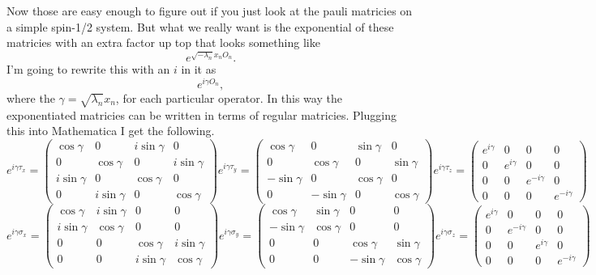 \documentclass[12pt]{extarticle}
\begin{document}
Now those are easy enough to figure out if you just look at the pauli matricies on a simple spin-1/2 system. But what we really want is the exponential of these matricies with an extra factor up top that looks something like
\begin{equation}
   e^{\sqrt{-\lambda_n}x_nO_n}.
\end{equation}
I'm going to rewrite this with an $i$ in it as
\begin{equation}
   e^{i\gamma O_n},
\end{equation}
where the $\gamma=\sqrt{\lambda_n}x_n$, for each particular operator. In this way the exponentiated matricies can be written in terms of regular matricies. Plugging this into Mathematica I get the following.
\footnotesize
\begin{equation*}
e^{i\gamma\tau_x}=
\begin{pmatrix}
    \cos\gamma & 0 & i\sin\gamma & 0 \\
    0 & \cos\gamma & 0 & i\sin\gamma \\
    i\sin\gamma & 0 & \cos\gamma & 0 \\
    0 & i\sin\gamma & 0 & \cos\gamma
\end{pmatrix}
e^{i\gamma\tau_y}=
\begin{pmatrix}
    \cos\gamma & 0 & \sin\gamma & 0 \\
    0 & \cos\gamma & 0 & \sin\gamma \\
    -\sin\gamma & 0 & \cos\gamma & 0 \\
    0 & -\sin\gamma & 0 & \cos\gamma
\end{pmatrix}
e^{i\gamma\tau_z}=
\begin{pmatrix}
    e^{i\gamma} & 0 & 0 & 0 \\
    0 & e^{i\gamma} & 0 & 0 \\
    0 & 0 & e^{-i\gamma} & 0 \\
    0 & 0 & 0 & e^{-i\gamma}
\end{pmatrix}
\end{equation*}
\begin{equation*}
e^{i\gamma\sigma_x}=
\begin{pmatrix}
    \cos\gamma & i\sin\gamma & 0 & 0 \\
    i\sin\gamma & \cos\gamma & 0 & 0 \\
    0 & 0 & \cos\gamma & i\sin\gamma \\
    0 & 0 & i\sin\gamma & \cos\gamma
\end{pmatrix}
e^{i\gamma\sigma_y}=
\begin{pmatrix}
    \cos\gamma & \sin\gamma & 0 & 0 \\
    -\sin\gamma & \cos\gamma & 0 & 0 \\
    0 & 0 & \cos\gamma & \sin\gamma \\
    0 & 0 & -\sin\gamma & \cos\gamma
\end{pmatrix}
e^{i\gamma\sigma_z}=
\begin{pmatrix}
    e^{i\gamma} & 0 & 0 & 0 \\
    0 & e^{-i\gamma} & 0 & 0 \\
    0 & 0 & e^{i\gamma} & 0 \\
    0 & 0 & 0 & e^{-i\gamma}
\end{pmatrix}
\end{equation*}
\end{document}
